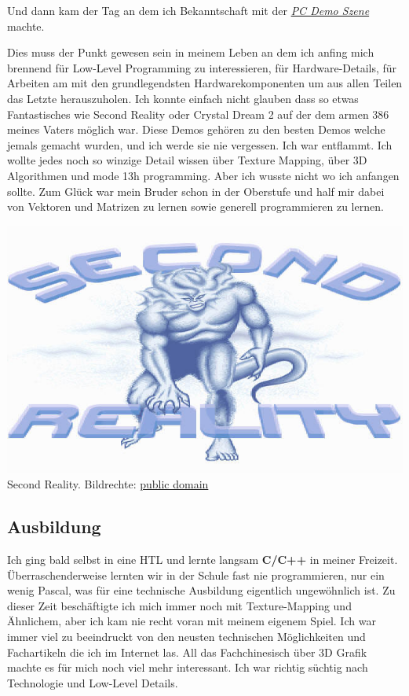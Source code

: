 \documentclass[10pt,a4paper,ngerman,twoside]{article} %
\begin{document}
\begin{multicols}{3}
Und dann kam der Tag an dem ich Bekanntschaft mit der \href{https://de.wikipedia.org/wiki/Demoszene}{\textit{PC Demo Szene}} machte.

Dies muss der Punkt gewesen sein in meinem Leben an dem ich anfing mich brennend für Low-Level Programming zu interessieren, für Hardware-Details, für Arbeiten am mit den grundlegendsten Hardwarekomponenten um aus allen Teilen das Letzte herauszuholen. Ich konnte einfach nicht glauben dass so etwas Fantastisches wie Second Reality oder Crystal Dream 2 auf der dem armen 386 meines Vaters möglich war. Diese Demos gehören zu den besten Demos welche jemals gemacht wurden, und ich werde sie nie vergessen. Ich war entflammt. Ich wollte jedes noch so winzige Detail wissen über Texture Mapping, über 3D Algorithmen und mode 13h programming. Aber ich wusste nicht wo ich anfangen sollte. Zum Glück war mein Bruder schon in der Oberstufe und half mir dabei von Vektoren und Matrizen zu lernen sowie generell  programmieren zu lernen.

\begin{center}
\includegraphics[width=0.9\linewidth]{austrianguy/austrianguy-secondreality.jpg}\\
\footnotesize{Second Reality. Bildrechte: \href{https://en.wikipedia.org/wiki/en:public_domain}{public domain}}
\end{center}

\subsection*{Ausbildung}

Ich ging bald selbst in eine HTL und lernte langsam \textbf{C/C++} in meiner Freizeit. Überraschenderweise lernten wir in der Schule fast nie programmieren, nur ein wenig Pascal, was für eine technische Ausbildung eigentlich ungewöhnlich ist. Zu dieser Zeit beschäftigte ich mich immer noch mit Texture-Mapping und Ähnlichem, aber ich kam nie recht voran mit meinem eigenem Spiel. Ich war immer viel zu beeindruckt von den neusten technischen Möglichkeiten und Fachartikeln die ich im Internet las. All das Fachchinesisch über 3D Grafik machte es für mich noch viel mehr interessant. Ich war richtig süchtig nach Technologie und Low-Level Details.


\end{multicols}
\end{document}
